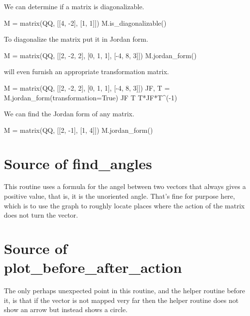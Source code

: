 We can determine if a matrix is diagonalizable.
\begin{sageoutput}
M =  matrix(QQ, [[4, -2], [1, 1]])  
M.is_diagonalizable()
\end{sageoutput}
\noindent
To diagonalize the matrix put it in Jordan form.
\begin{sageoutput}
M =  matrix(QQ, [[2, -2, 2], [0, 1, 1], [-4, 8, 3]])  
M.jordan_form()
\end{sageoutput}
\noindent \Sage{} will even furnish an appropriate transformation matrix.
\begin{sageoutput}[d,0,1]
M =  matrix(QQ, [[2, -2, 2], [0, 1, 1], [-4, 8, 3]])  
JF, T = M.jordan_form(transformation=True)
JF
T
T*JF*T^(-1)
\end{sageoutput}

We can find the Jordan form of any matrix.
\begin{sageoutput}
M =  matrix(QQ, [[2, -1], [1, 4]])  
M.jordan_form()
\end{sageoutput}



\section{Source of find\_angles}
This routine uses a formula for the angel between two vectors that 
always gives a positive value, that is, it is the unoriented angle.
That's fine for purpose here, which is to use the graph to 
roughly locate places where the action of the matrix does not turn the
vector. 



\section{Source of plot\_before\_after\_action}
The only perhaps unexpected point in this routine, and the helper routine
before it, is that if the vector is not mapped very far then the helper
routine does not show an arrow but instead shows a circle.



\endinput

TODO

1) Does python intro show 
   > x, y = 5, 7
construct?